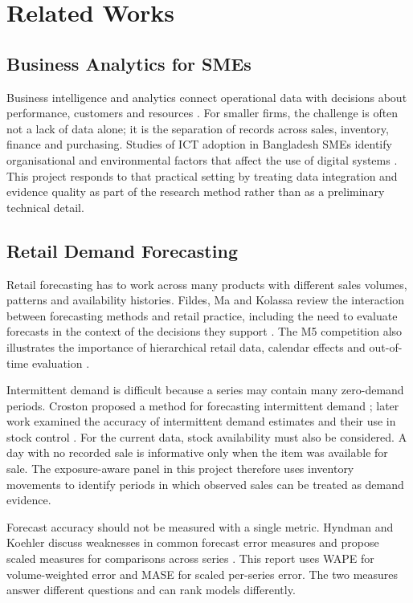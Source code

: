\chapter{Related Works}
\label{chapter_backStudy}

\section{Business Analytics for SMEs}
Business intelligence and analytics connect operational data with decisions about performance, customers and resources \citep{chen2012business}. For smaller firms, the challenge is often not a lack of data alone; it is the separation of records across sales, inventory, finance and purchasing. Studies of ICT adoption in Bangladesh SMEs identify organisational and environmental factors that affect the use of digital systems \citep{hoque2016ict,shahadat2023digital}. This project responds to that practical setting by treating data integration and evidence quality as part of the research method rather than as a preliminary technical detail.

\section{Retail Demand Forecasting}
Retail forecasting has to work across many products with different sales volumes, patterns and availability histories. Fildes, Ma and Kolassa review the interaction between forecasting methods and retail practice, including the need to evaluate forecasts in the context of the decisions they support \citep{fildes2022retail}. The M5 competition also illustrates the importance of hierarchical retail data, calendar effects and out-of-time evaluation \citep{makridakis2022m5}.

Intermittent demand is difficult because a series may contain many zero-demand periods. Croston proposed a method for forecasting intermittent demand \citep{croston1972intermittent}; later work examined the accuracy of intermittent demand estimates and their use in stock control \citep{syntetos2005intermittent,syntetos2010stock}. For the current data, stock availability must also be considered. A day with no recorded sale is informative only when the item was available for sale. The exposure-aware panel in this project therefore uses inventory movements to identify periods in which observed sales can be treated as demand evidence.

Forecast accuracy should not be measured with a single metric. Hyndman and Koehler discuss weaknesses in common forecast error measures and propose scaled measures for comparisons across series \citep{hyndman2006accuracy}. This report uses WAPE for volume-weighted error and MASE for scaled per-series error. The two measures answer different questions and can rank models differently.

